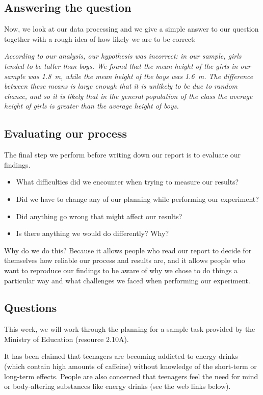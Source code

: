 \subsection*{Answering the question}
Now, we look at our data processing and we give a simple answer to our question together with a rough idea of how likely
we are to be correct:

\begin{center}\itshape
  According to our analysis, our hypothesis was incorrect: in our sample, girls tended to be taller than boys. We found
  that the mean height of the girls in our sample was \SI{1.8}{\metre}, while the mean height of the boys was \SI{1.6}{\metre}.
  The difference between these means is large enough that it is unlikely to be due to random chance, and so it is likely that
  in the general population of the class the average height of girls is greater than the average height of boys.
\end{center}

\subsection*{Evaluating our process}
The final step we perform before writing down our report is to evaluate our findings.
\begin{itemize}
  \item What difficulties did we encounter when trying to measure our results?
  \item Did we have to change any of our planning while performing our experiment?
  \item Did anything go wrong that might affect our results?
  \item Is there anything we would do differently? Why?
\end{itemize}

Why do we do this? Because it allows people who read our report to decide for themselves how reliable our process
and results are, and it allows people who want to reproduce our findings to be aware of why we chose to do things
a particular way and what challenges we faced when performing our experiment.

\subsection*{Questions}
This week, we will work through the planning for a sample task provided by the Ministry of Education (resource 2.10A).

It has been claimed that teenagers are becoming addicted to energy drinks (which contain high amounts of caffeine) without
knowledge of the short-term or long-term effects. People are also concerned that teenagers feel the need for mind or
body-altering substances like energy drinks (see the web links below).


